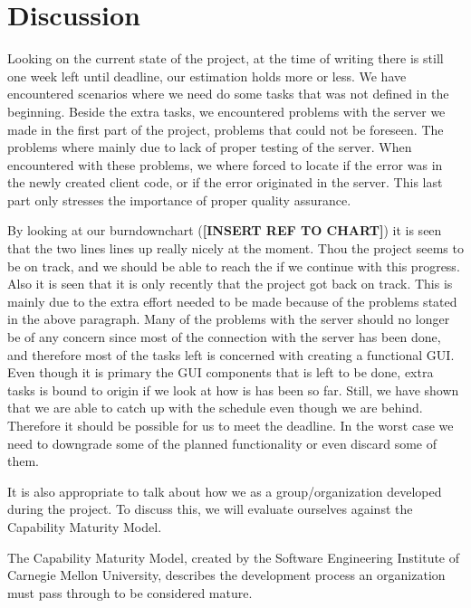 \section{Discussion}
Looking on the current state of the project, at the time of writing there is still one week left until deadline, our estimation holds more or less. We have encountered scenarios where we need do some tasks that was not defined in the beginning. Beside the extra tasks, we encountered problems with the server we made in the first part of the project, problems that could not be foreseen. The problems where mainly due to lack of proper testing of the server. When encountered with these problems, we where forced to locate if the error was in the newly created client code, or if the error originated in the server. This last part only stresses the importance of proper quality assurance.

By looking at our burndownchart (\textbf{[INSERT REF TO CHART]}) it is seen that the two lines lines up really nicely at the moment. Thou the project seems to be on track, and we should be able to reach the if we continue with this progress. Also it is seen that it is only recently that the project got back on track. This is mainly due to the extra effort needed to be made because of the problems stated in the above paragraph. Many of the problems with the server should no longer be of any concern since most of the connection with the server has been done, and therefore most of the tasks left is concerned with creating a functional GUI. \\
Even though it is primary the GUI components that is left to be done, extra tasks is bound to origin if we look at how is has been so far. Still, we have shown that we are able to catch up with the schedule even though we are behind. Therefore it should be possible for us to meet the deadline. In the worst case we need to downgrade some of the planned functionality or even discard some of them.

It is also appropriate to talk about how we as a group/organization developed during the project. To discuss this, we will evaluate ourselves against the Capability Maturity Model.

The Capability Maturity Model, created by the Software Engineering Institute of Carnegie Mellon University, describes the development process an organization must pass through to be considered mature.

